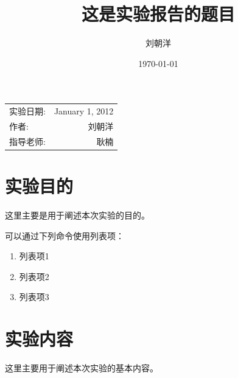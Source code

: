 \documentclass[hyperref,UTF8]{ctexart}
\title{这是实验报告的题目} %
\author{\kaishu 刘朝洋} %
\date{\today} %
\begin{document}
\maketitle %

\begin{center}
\begin{tabular}{l r}
实验日期: & January 1, 2012 \\ %
作者: & 刘朝洋 \\ %
指导老师: & 耿楠 %
\end{tabular}
\end{center}



\section{实验目的}

这里主要是用于阐述本次实验的目的。

可以通过下列命令使用列表项：

\begin{enumerate}

\item 列表项1
\item 列表项2
\item 列表项3

\end{enumerate}
 

\section{实验内容}

这里主要用于阐述本次实验的基本内容。

\end{document}
